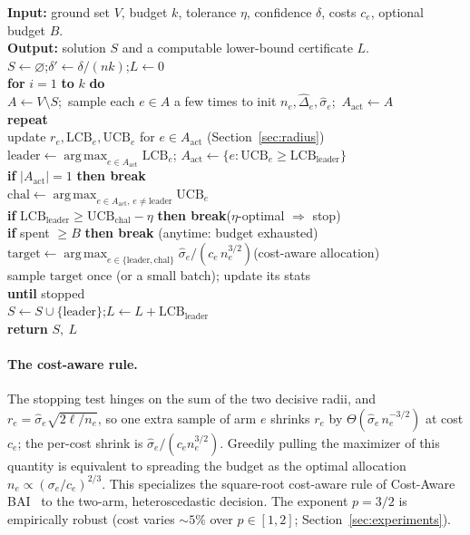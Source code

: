 \documentclass[11pt]{article}
\theoremstyle{plain}
\theoremstyle{definition}
\newcommand{\algindent}[1]{\hspace*{#1em}}
\newcommand{\LCB}{\mathrm{LCB}}
\newcommand{\UCB}{\mathrm{UCB}}
\DeclareMathOperator*{\argmax}{arg\,max}
\begin{document}
\begin{algorithm}[t]
\caption{Cost-Aware Confidence Greedy (CACG)}\label{alg:cacg}
\small
\textbf{Input:} ground set $V$, budget $k$, tolerance $\eta$, confidence
$\delta$, costs $c_e$, optional budget $B$.\\
\textbf{Output:} solution $S$ and a computable lower-bound certificate $L$.\\[2pt]
$S\gets\varnothing$;\quad $\delta'\gets\delta/(nk)$;\quad $L\gets 0$\\
\textbf{for} $i=1$ \textbf{to} $k$ \textbf{do}\\
\algindent{1} $A\gets V\setminus S$;\ sample each $e\in A$ a few times to
              init $n_e,\widehat\Delta_e,\widehat\sigma_e$;\ $A_{\mathrm{act}}\gets A$\\
\algindent{1} \textbf{repeat}\\
\algindent{2} update $r_e,\LCB_e,\UCB_e$ for $e\in A_{\mathrm{act}}$
              (Section~\ref{sec:radius})\\
\algindent{2} $\text{leader}\gets\argmax_{e\in A_{\mathrm{act}}}\LCB_e$;\quad
              $A_{\mathrm{act}}\gets\{e:\UCB_e\ge\LCB_{\text{leader}}\}$\\
\algindent{2} \textbf{if} $|A_{\mathrm{act}}|=1$ \textbf{then break}\\
\algindent{2} $\text{chal}\gets\argmax_{e\in A_{\mathrm{act}},\,e\ne\text{leader}}\UCB_e$\\
\algindent{2} \textbf{if} $\LCB_{\text{leader}}\ge\UCB_{\text{chal}}-\eta$
              \textbf{then break}\hfill($\eta$-optimal $\Rightarrow$ stop)\\
\algindent{2} \textbf{if} spent $\ge B$ \textbf{then break}
              \hfill(anytime: budget exhausted)\\
\algindent{2} $\text{target}\gets\argmax_{e\in\{\text{leader},\text{chal}\}}
              \widehat\sigma_e/(c_e\,n_e^{3/2})$\hfill(cost-aware allocation)\\
\algindent{2} sample $\text{target}$ once (or a small batch); update its stats\\
\algindent{1} \textbf{until} stopped\\
\algindent{1} $S\gets S\cup\{\text{leader}\}$;\quad $L\gets L+\LCB_{\text{leader}}$\\
\textbf{return} $S,\ L$
\end{algorithm}

\paragraph{The cost-aware rule.}
The stopping test hinges on the sum of the two decisive radii, and
$r_e=\widehat\sigma_e\sqrt{2\ell/n_e}$, so one extra sample of arm $e$
shrinks $r_e$ by $\Theta(\widehat\sigma_e\, n_e^{-3/2})$ at cost $c_e$; the
per-cost shrink is $\widehat\sigma_e/(c_e n_e^{3/2})$. Greedily pulling the
maximizer of this quantity is equivalent to spreading the budget as the
optimal allocation $n_e\propto(\sigma_e/c_e)^{2/3}$. This specializes the
square-root cost-aware rule of Cost-Aware BAI~\cite{Kanarios2024} to the
two-arm, heteroscedastic decision. The exponent $p=3/2$ is empirically
robust (cost varies $\sim5\%$ over $p\in[1,2]$; Section~\ref{sec:experiments}).
\end{document}
